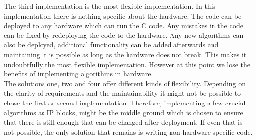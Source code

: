\documentclass[conference]{IEEEtran}
\begin{document}
The third implementation is the most flexible implementation. In this implementation there is nothing specific about the hardware. The code can be deployed to any hardware which can run the C code. Any mistakes in the code can be fixed by redeploying the code to the hardware. Any new algorithms can also be deployed, additional functionality can be added afterwards and maintaining it is possible as long as the hardware does not break. This makes it undoubtfully the most flexible implementation. However at this point we lose the benefits of implementing algorithms in hardware. \\
The solutions one, two and four offer different kinds of flexibility. Depending on the clarity of requirements and the maintainability it might not be possible to chose the first or second implementation. Therefore, implementing a few crucial algorithms as IP blocks, might be the middle ground which is chosen to ensure that there is still enough that can be changed after deployment. If even that is not possible, the only solution that remains is writing non hardware specific code.
\end{document}
